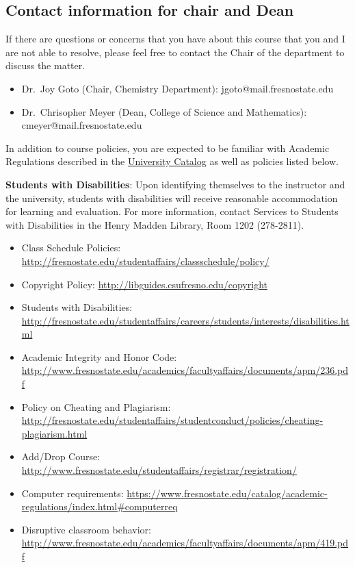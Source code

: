 \hypertarget{contact-information-for-chair-and-dean}{%
\subsection{Contact information for chair and
Dean}\label{contact-information-for-chair-and-dean}}

If there are questions or concerns that you have about this course that
you and I are not able to resolve, please feel free to contact the Chair
of the department to discuss the matter.

\begin{itemize}
\tightlist
\item
  Dr.~Joy Goto (Chair, Chemistry Department): jgoto@mail.fresnostate.edu
\item
  Dr.~Chrisopher Meyer (Dean, College of Science and Mathematics):
  cmeyer@mail.fresnostate.edu
\end{itemize}

In addition to course policies, you are expected to be familiar with
Academic Regulations described in the
\href{http://www.fresnostate.edu/catalog/academic-regulations/}{University
Catalog} as well as policies listed below.

\textbf{Students with Disabilities}: Upon identifying themselves to the
instructor and the university, students with disabilities will receive
reasonable accommodation for learning and evaluation. For more
information, contact Services to Students with Disabilities in the Henry
Madden Library, Room 1202 (278-2811).

\begin{itemize}
\tightlist
\item
  Class Schedule Policies:
  \url{http://fresnostate.edu/studentaffairs/classschedule/policy/}
\item
  Copyright Policy: \url{http://libguides.csufresno.edu/copyright}
\item
  Students with Disabilities:
  \url{http://fresnostate.edu/studentaffairs/careers/students/interests/disabilities.html}
\item
  Academic Integrity and Honor Code:
  \url{http://www.fresnostate.edu/academics/facultyaffairs/documents/apm/236.pdf}
\item
  Policy on Cheating and Plagiarism:
  \url{http://fresnostate.edu/studentaffairs/studentconduct/policies/cheating-plagiarism.html}
\item
  Add/Drop Course:
  \url{http://www.fresnostate.edu/studentaffairs/registrar/registration/}
\item
  Computer requirements:
  \url{https://www.fresnostate.edu/catalog/academic-regulations/index.html\#computerreq}
\item
  Disruptive classroom behavior:
  \url{http://www.fresnostate.edu/academics/facultyaffairs/documents/apm/419.pdf}
\end{itemize}


